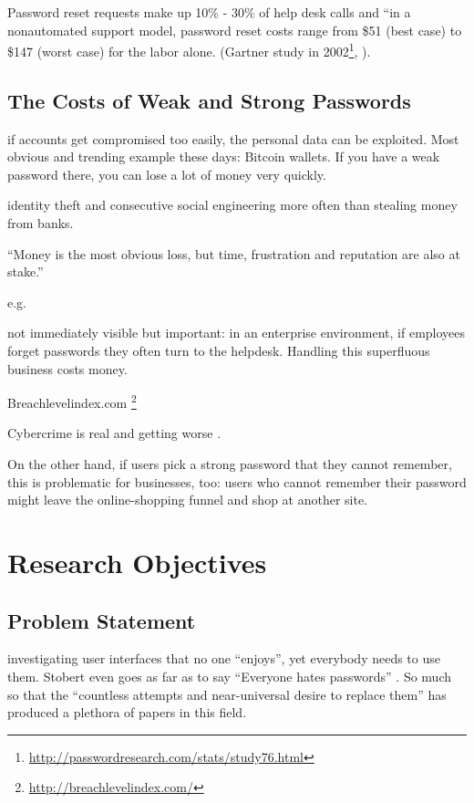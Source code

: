Password reset requests make up 10\% - 30\% of help desk calls and ``in a nonautomated support model, password reset costs range from \$51 (best case) to \$147 (worst case) for the labor alone. (Gartner study in 2002\footnote{\url{http://passwordresearch.com/stats/study76.html}}, ).

\subsection{The Costs of Weak and Strong Passwords}

if accounts get compromised too easily, the personal data can be exploited. Most obvious and trending example these days: Bitcoin wallets. If you have a weak password there, you can lose a lot of money very quickly.

identity theft and consecutive social engineering more often than stealing money from banks.

``Money is the most obvious loss, but time, frustration and reputation are also at stake.'' \cite{Herley2012PersistenceOfPasswords}

 e.g. \cite{CSID2012PasswordHabits} 

not immediately visible but important: in an enterprise environment, if employees forget passwords they often turn to the helpdesk. Handling this superfluous business costs money. 

Breachlevelindex.com \footnote{\url{http://breachlevelindex.com/}}

Cybercrime is real and getting worse \cite{BKA2016Bundeslagebild}.

On the other hand, if users pick a strong password that they cannot remember, this is problematic for businesses, too: users who cannot remember their password might leave the online-shopping funnel and shop at another site.

\section{Research Objectives}\label{sec:intro:researchobjectives}



\subsection{Problem Statement}
investigating user interfaces that no one ``enjoys'', yet everybody needs to use them. Stobert even goes as far as to say ``Everyone hates passwords'' \cite{Stobert2014Agony}. So much so that the ``countless attempts and near-universal desire to replace them''  \cite{Herley2012PersistenceOfPasswords} has produced a plethora of papers in this field.

